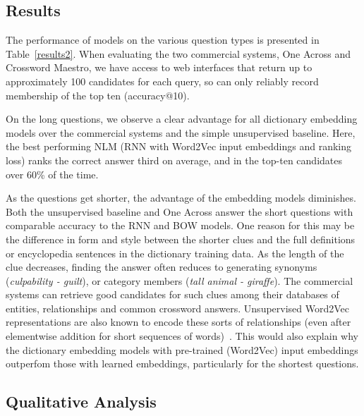 \subsection{Results}

The performance of models on the various question types is presented in Table~\ref{results2}. When evaluating the two commercial systems, One Across and Crossword Maestro, we have access to web interfaces that return up to approximately 100 candidates for each query, so can only reliably record membership of the top ten (accuracy@10).

On the long questions, we observe a clear advantage for all dictionary embedding models over the commercial systems and the simple unsupervised baseline. Here, the best performing NLM (RNN with Word2Vec input embeddings and ranking loss) ranks the correct answer third on average, and in the top-ten candidates over 60\% of the time.
	
As the questions get shorter, the advantage of the embedding models diminishes. Both the unsupervised baseline and One Across answer the short questions with comparable accuracy to the RNN and BOW models. One reason for this may be the difference in form and style between the shorter clues and the full definitions or encyclopedia sentences in the dictionary training data. As the length of the clue decreases, finding the answer often reduces to generating synonyms (\emph{culpability - guilt}), or category members (\emph{tall animal - giraffe}). The commercial systems can retrieve good candidates for such clues among their databases of entities, relationships and common crossword answers. Unsupervised Word2Vec representations are also  known to encode these sorts of relationships (even after elementwise addition for short sequences of words)~\cite{mikolov2013distributed}. This would also explain why the dictionary embedding models with pre-trained (Word2Vec) input embeddings outperfom those with learned embeddings, particularly for the shortest questions. 


\subsection{Qualitative Analysis}


